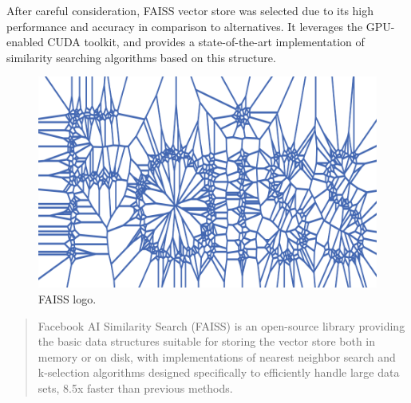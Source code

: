 After careful consideration, FAISS vector store was selected due to its high performance and accuracy in comparison to alternatives. It leverages the GPU-enabled CUDA toolkit, and provides a state-of-the-art implementation of similarity searching algorithms based on this structure.
\begin{figure}[H]
    \centering
    \includegraphics[width=.5\linewidth]{./figures/faiss_logo.png}
    \caption{FAISS logo.}
\end{figure}
\begin{quote}
    Facebook AI Similarity Search (FAISS) is an open-source library providing the basic data structures suitable for storing the vector store both in memory or on disk, with implementations of nearest neighbor search and k-selection algorithms designed specifically to efficiently handle large data sets, 8.5x faster than previous methods.
\end{quote}
